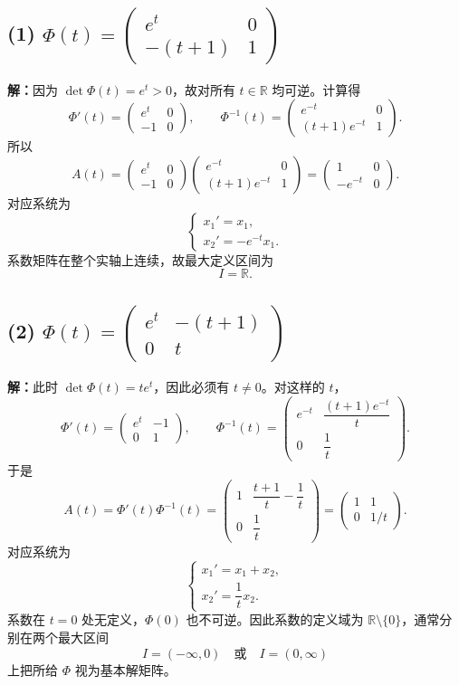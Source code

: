 \documentclass[11pt,a4paper]{ctexart}
\newcommand{\R}{\mathbb R}
\begin{document}
\subsection*{(1) $\displaystyle\Phi(t)=\begin{pmatrix}e^t&0\\-(t+1)&1\end{pmatrix}$}
\textbf{解：}因为 $\det\Phi(t)=e^t>0$，故对所有 $t\in\R$ 均可逆。计算得
\[
\Phi'(t)=\begin{pmatrix}e^t&0\\-1&0\end{pmatrix},\qquad
\Phi^{-1}(t)=\begin{pmatrix}e^{-t}&0\\(t+1)e^{-t}&1\end{pmatrix}.
\]
所以
\[
A(t)=\begin{pmatrix}e^t&0\\-1&0\end{pmatrix}
\begin{pmatrix}e^{-t}&0\\(t+1)e^{-t}&1\end{pmatrix}
=\begin{pmatrix}1&0\\-e^{-t}&0\end{pmatrix}.
\]
对应系统为
\[
\boxed{\begin{cases}x_1'=x_1,\\x_2'=-e^{-t}x_1.\end{cases}}
\]
系数矩阵在整个实轴上连续，故最大定义区间为
\[
\boxed{I=\R.}
\]

\subsection*{(2) $\displaystyle\Phi(t)=\begin{pmatrix}e^t&-(t+1)\\0&t\end{pmatrix}$}
\textbf{解：}此时 $\det\Phi(t)=te^t$，因此必须有 $t\ne0$。对这样的 $t$，
\[
\Phi'(t)=\begin{pmatrix}e^t&-1\\0&1\end{pmatrix},\qquad
\Phi^{-1}(t)=\begin{pmatrix}e^{-t}&\dfrac{(t+1)e^{-t}}{t}\\0&\dfrac1t\end{pmatrix}.
\]
于是
\[
A(t)=\Phi'(t)\Phi^{-1}(t)
=\begin{pmatrix}1&\dfrac{t+1}{t}-\dfrac1t\\0&\dfrac1t\end{pmatrix}
=\begin{pmatrix}1&1\\0&1/t\end{pmatrix}.
\]
对应系统为
\[
\boxed{\begin{cases}x_1'=x_1+x_2,\\x_2'=\dfrac1t x_2.\end{cases}}
\]
系数在 $t=0$ 处无定义，$\Phi(0)$ 也不可逆。因此系数的定义域为 $\R\setminus\{0\}$，通常分别在两个最大区间
\[
\boxed{I=(-\infty,0)\quad\text{或}\quad I=(0,\infty)}
\]
上把所给 $\Phi$ 视为基本解矩阵。
\end{document}
